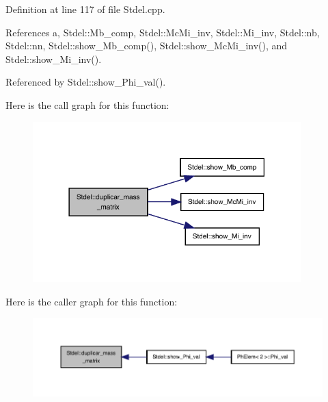Definition at line 117 of file Stdel.\+cpp.



References a, Stdel\+::\+Mb\+\_\+comp, Stdel\+::\+Mc\+Mi\+\_\+inv, Stdel\+::\+Mi\+\_\+inv, Stdel\+::nb, Stdel\+::nn, Stdel\+::show\+\_\+\+Mb\+\_\+comp(), Stdel\+::show\+\_\+\+Mc\+Mi\+\_\+inv(), and Stdel\+::show\+\_\+\+Mi\+\_\+inv().



Referenced by Stdel\+::show\+\_\+\+Phi\+\_\+val().

Here is the call graph for this function\+:
\nopagebreak
\begin{figure}[H]
\begin{center}
\leavevmode
\includegraphics[width=294pt]{classStdel_a922b779be1f8f12b7a5535ab529bff64_cgraph}
\end{center}
\end{figure}
Here is the caller graph for this function\+:
\nopagebreak
\begin{figure}[H]
\begin{center}
\leavevmode
\includegraphics[width=350pt]{classStdel_a922b779be1f8f12b7a5535ab529bff64_icgraph}
\end{center}
\end{figure}
\mbox{\label{classHexahedral_a795f04a1d90b00114cc30a26355a6e9b}} 
